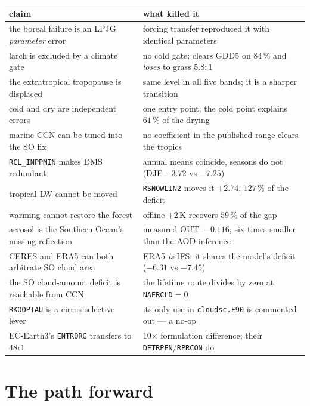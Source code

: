 \documentclass[10pt]{article}
\begin{document}
\begin{center}\footnotesize
\begin{tabular}{l l}
\toprule
claim & what killed it \\
\midrule
the boreal failure is an LPJG \emph{parameter} error & forcing transfer reproduced it with identical parameters \\
larch is excluded by a climate gate & no cold gate; clears GDD5 on $84\,\%$ and \emph{loses} to grass $5.8\!:\!1$ \\
the extratropical tropopause is displaced & same level in all five bands; it is a sharper transition \\
cold and dry are independent errors & one entry point; the cold point explains $61\,\%$ of the drying \\
marine CCN can be tuned into the SO fix & no coefficient in the published range clears the tropics \\
\texttt{RCL\_INPPMIN} makes DMS redundant & annual means coincide, seasons do not (DJF $-3.72$ vs $-7.25$) \\
tropical LW cannot be moved & \texttt{RSNOWLIN2} moves it $+2.74$, $127\,\%$ of the deficit \\
warming cannot restore the forest & offline $+2$\,K recovers $59\,\%$ of the gap \\
aerosol is the Southern Ocean's missing reflection & measured OUT: $-0.116$, six times smaller than the AOD inference \\
CERES and ERA5 can both arbitrate SO cloud area & ERA5 \emph{is} IFS; it shares the model's deficit ($-6.31$ vs $-7.45$) \\
the SO cloud-amount deficit is reachable from CCN & the lifetime route divides by zero at \texttt{NAERCLD}$=0$ \\
\texttt{RKOOPTAU} is a cirrus-selective lever & its only use in \texttt{cloudsc.F90} is commented out --- a no-op \\
EC-Earth3's \texttt{ENTRORG} transfers to 48r1 & 10$\times$ formulation difference; their \texttt{DETRPEN}/\texttt{RPRCON} do \\
\bottomrule
\end{tabular}
\end{center}

\section{The path forward}\label{sec:forward}
\end{document}
